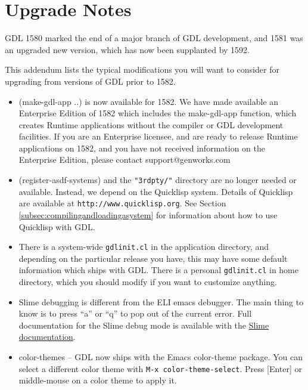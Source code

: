 \documentclass [11pt]{book}
\begin{document}
\chapter*{Upgrade Notes}

\label{chap:upgradenotes}

GDL 1580 marked the end of a major branch of GDL development,
and 1581 was an upgraded new version, which has now been supplanted by
1592.

This addendum lists the typical modifications you will want to
consider for upgrading from versions of GDL prior to 1582.

\begin{itemize}

\item (make-gdl-app ..) is now available for 1582. We have
made available an Enterprise Edition of 1582 which includes the
make-gdl-app function, which creates Runtime applications without the
compiler or GDL development facilities.  If you are an Enterprise
licensee, and are ready to release Runtime applications on 1582, and
you have not received information on the Enterprise Edition, please
contact support@genworks.com

\item (register-asdf-systems) and the \texttt{"3rdpty/"} directory are no longer needed or available. Instead, we depend on the Quicklisp
system. Details of Quicklisp are available at \texttt{http://www.quicklisp.org}. See Section 
\ref{subsec:compilingandloadingasystem} for information about how to use Quicklisp with GDL.

\item There is a system-wide \texttt{gdlinit.cl} in the application directory, and depending on the
       particular release you have, this may have some default
       information which ships with GDL. There is a personal \texttt{gdlinit.cl} in home directory, which you should modify if you want to
       customize anything.

\item Slime debugging is different from the ELI emacs debugger. The main thing to know is 
to press ``a'' or ``q'' to pop out of the current error. Full documentation for the Slime debug mode
is available with the \href{http://common-lisp.net/project/slime/doc/html/Debugger.html}{Slime documentation}.

\item color-themes -- GDL now ships with the Emacs
       color-theme package. You can select a different color theme with \texttt{M-x color-theme-select}. Press [Enter] or middle-mouse on a color theme to apply it.


\end{itemize}
\end{document}
